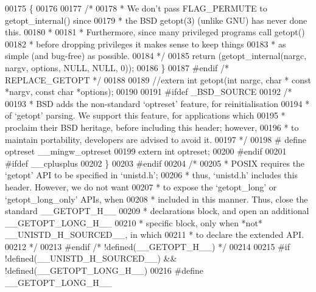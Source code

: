 \begin{DoxyCode}
{{{{{{{00175 \{
00176 
00177     \textcolor{comment}{/*}
00178 \textcolor{comment}{     * We don't pass FLAG\_PERMUTE to getopt\_internal() since}
00179 \textcolor{comment}{     * the BSD getopt(3) (unlike GNU) has never done this.}
00180 \textcolor{comment}{     *}
00181 \textcolor{comment}{     * Furthermore, since many privileged programs call getopt()}
00182 \textcolor{comment}{     * before dropping privileges it makes sense to keep things}
00183 \textcolor{comment}{     * as simple (and bug-free) as possible.}
00184 \textcolor{comment}{     */}
00185     \textcolor{keywordflow}{return} (getopt_internal(nargc, nargv, options, NULL, NULL, 0));
00186 \}
00187 \textcolor{preprocessor}{#endif }\textcolor{comment}{/* REPLACE\_GETOPT */}\textcolor{preprocessor}{}
00188 
00189 \textcolor{comment}{//extern int getopt(int nargc, char * const *nargv, const char *options);}
00190 
00191 \textcolor{preprocessor}{#ifdef \_BSD\_SOURCE}
00192 \textcolor{comment}{/*}
00193 \textcolor{comment}{ * BSD adds the non-standard `optreset' feature, for reinitialisation}
00194 \textcolor{comment}{ * of `getopt' parsing.  We support this feature, for applications which}
00195 \textcolor{comment}{ * proclaim their BSD heritage, before including this header; however,}
00196 \textcolor{comment}{ * to maintain portability, developers are advised to avoid it.}
00197 \textcolor{comment}{ */}
00198 \textcolor{preprocessor}{# define optreset  \_\_mingw\_optreset}
00199 \textcolor{keyword}{extern} \textcolor{keywordtype}{int} optreset;
00200 \textcolor{preprocessor}{#endif}
00201 \textcolor{preprocessor}{#ifdef \_\_cplusplus}
00202 \}
00203 \textcolor{preprocessor}{#endif}
00204 \textcolor{comment}{/*}
00205 \textcolor{comment}{ * POSIX requires the `getopt' API to be specified in `unistd.h';}
00206 \textcolor{comment}{ * thus, `unistd.h' includes this header.  However, we do not want}
00207 \textcolor{comment}{ * to expose the `getopt\_long' or `getopt\_long\_only' APIs, when}
00208 \textcolor{comment}{ * included in this manner.  Thus, close the standard \_\_GETOPT\_H\_\_}
00209 \textcolor{comment}{ * declarations block, and open an additional \_\_GETOPT\_LONG\_H\_\_}
00210 \textcolor{comment}{ * specific block, only when *not* \_\_UNISTD\_H\_SOURCED\_\_, in which}
00211 \textcolor{comment}{ * to declare the extended API.}
00212 \textcolor{comment}{ */}
00213 \textcolor{preprocessor}{#endif }\textcolor{comment}{/* !defined(\_\_GETOPT\_H\_\_) */}\textcolor{preprocessor}{}
00214 
00215 \textcolor{preprocessor}{#if !defined(\_\_UNISTD\_H\_SOURCED\_\_) && !defined(\_\_GETOPT\_LONG\_H\_\_)}
00216 \textcolor{preprocessor}{#define \_\_GETOPT\_LONG\_H\_\_}
}}}}}}}
\end{DoxyCode}
